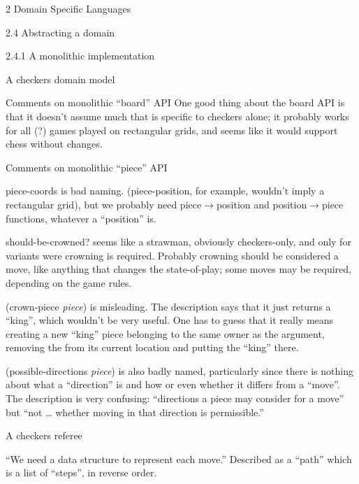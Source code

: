 \documentclass[12pt]{PalisadesLakesBook}
\begin{document}
\begin{plSection}{}
\begin{plSection}{2 Domain Specific Languages}
\begin{plSection}{2.4 Abstracting a domain}
\begin{plSection}{2.4.1 A monolithic implementation}
\begin{plSection}{A checkers domain model}
\begin{plSection}{Comments on monolithic ``board'' API}
One good thing about the {\schemeFont board} API is that
it doesn't assume much that is specific to checkers alone;
it probably works for all (?) games played on rectangular grids,
and seems like it would support chess without changes.

\end{plSection}%
\begin{plSection}{Comments on monolithic ``piece'' API}

{\schemeFont piece-coords} is bad naming.
({\schemeFont piece-position}, for example,
wouldn't imply a rectangular grid),
but we probably need piece$\rightarrow$position
and position$\rightarrow$piece functions, whatever a ``position''
is.

{\schemeFont should-be-crowned?} seems like a strawman,
obviously checkers-only, and only for variants were crowning is
required. 
Probably crowning should be considered a move,
like anything that changes the state-of-play;
some moves may be required, depending on the game rules.

{\schemeFont (crown-piece {\itshape piece})} is misleading.
The description says that it just returns a ``king'',
which wouldn't be very useful.
One has to guess that it really means creating a new ``king''
piece belonging to the same owner as the
{} argument,
removing the {} from its current
location and putting the ``king'' there.

{\schemeFont (possible-directions {\itshape piece})}
is also badly named, particularly since there is nothing
about what a ``direction'' is and how or even whether it differs
from a ``move''.
The description is very confusing:
``directions a piece may consider for a move''
but 
``not {\ldots} whether moving in that direction is permissible.''

\end{plSection}%
\end{plSection}%
\begin{plSection}{A checkers referee}

``We need a data structure to represent each move.''
Described as a ``path'' which is a list of ``steps'',
in reverse order.


\end{plSection}
\end{plSection}
\end{plSection}
\end{plSection}
\end{plSection}
\end{document}
